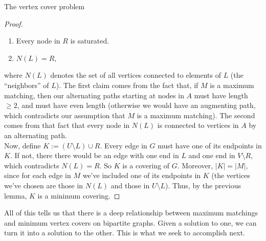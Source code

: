 \begin{section}{The vertex cover problem}
\begin{proof}
		\begin{enumerate}
			\item Every node in $R$ is saturated.
			\item $N(L) = R$,
		\end{enumerate}
		where $N(L)$ denotes the set of all vertices connected to elements of $L$ (the 
		``neighbors'' of $L$). The first claim comes from the fact that, if $M$ is a 
		maximum matching, then our alternating paths starting at nodes in $A$ must have 
		length $\geq 2$, and must have even length (otherwise we would have an augmenting path, 
		which contradicts our assumption that $M$ is a maximum matching).
		The second comes from that fact that every node in $N(L)$ is connected to vertices in 
		$A$ by an alternating path. \\
		Now, define $K := (U\setminus L)\cup R$. Every edge 
		in $G$ must have one of its endpoints in $K$. If not, there there would be an 
		edge with one end in $L$ and one end in $V\setminus R$, which contradicts 
		$N(L) = R$. So $K$ is a covering of $G$. Moreover, $|K| = |M|$, since for each 
		edge in $M$ we've included one of its endpoints in $K$ (the vertices we've chosen are 
		those in $N(L)$ and those in $U\setminus L$). Thus, by the previous lemma, $K$ is 
		a minimum covering.
	\end{proof}
	All of this tells us that there is a deep relationship between maximum matchings and 
	minimum vertex covers on bipartite graphs. Given a solution to one, we can turn it into a 
	solution to the other. This is what we seek to accomplish next. 
\end{section}

